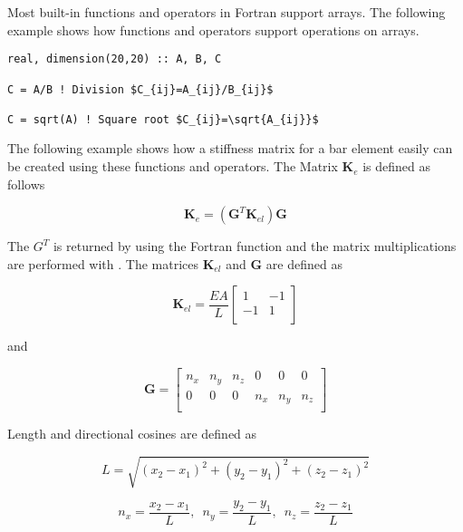 Most built-in functions and operators in Fortran support arrays. The following example shows how functions and operators support operations on arrays.

\begin{lstlisting}[texcl]
real, dimension(20,20) :: A, B, C

C = A/B ! Division $C_{ij}=A_{ij}/B_{ij}$

C = sqrt(A) ! Square root $C_{ij}=\sqrt{A_{ij}}$
\end{lstlisting}

The following example shows how a stiffness matrix for a bar element easily can be created using these functions and operators. The Matrix $\mathbf{K}_{e}$ is defined as follows

\begin{equation}
\mathbf{K}_{e} =(\mathbf{G}^{T} \mathbf{K}_{el} )\mathbf{G}
\end{equation}

The $G^T$ is returned by using the Fortran function  and the matrix multiplications are performed with . The matrices $\mathbf{K}_{el}$ and $\mathbf{G}$ are defined as

\begin{equation}
\mathbf{K}_{el} =\frac{EA}{L} \left[
\begin{array}{cc}
1 & -1 \\
-1 & 1 \\
\end{array}
\right]
\end{equation}

and

\begin{equation}
\mathbf{G}=\left[
\begin{array}{cccccc}
n_{x}  & n_{y}  & n_{z}  & 0 & 0 & 0 \\
0 & 0 & 0 & n_{x} & n_{y} & n_{z} \\
\end{array}
\right]
\end{equation}

Length and directional cosines are defined as

\begin{equation}
L=\sqrt{(x_{2} -x_{1} )^{2} +(y_{2} -y_{1} )^{2} +(z_{2} -z_{1}
)^{2}}
\end{equation}

\begin{equation}
n_{x} =\frac{x_{2} -x_{1} }{L} ,\,\,\,n_{y} =\frac{y_{2} -y_{1}
}{L} ,\,\,\,n_{z} =\frac{z_{2} -z_{1} }{L}
\end{equation}

